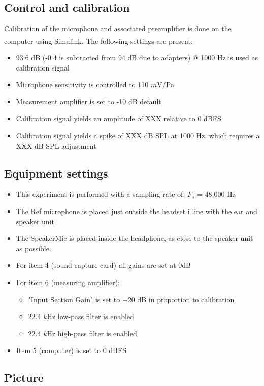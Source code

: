 \subsection{Control and calibration}
Calibration of the microphone and associated preamplifier is done on the computer using Simulink\textsuperscript{\textregistered}. The following settings are present:
\begin{itemize}
	\item 93.6 dB (-0.4 is subtracted from 94 dB due to adapters) $@$ 1000 Hz is used as calibration signal
	\item Microphone sensitivity is controlled to 110 $m$V/Pa
	\item Measurement amplifier is set to -10 dB default
	\item Calibration signal yields an amplitude of XXX relative to 0 dBFS
	\item  Calibration signal yields a spike of XXX dB SPL at 1000 Hz, which requires a XXX dB SPL adjustment
\end{itemize}
\subsection{Equipment settings}
\begin{itemize}
	\item This experiment is performed with a sampling rate of, $F_{s}$ = 48,000 Hz
	\item The Ref microphone is placed just outside the headset i line with the ear and speaker unit
	\item The SpeakerMic is placed inside the headphone, as close to the speaker unit as possible. 
	\item For item 4 (sound capture card) all gains are set at 0dB		
	\item For item 6 (measuring amplifier):
	\begin{itemize}
		\item "Input Section Gain" is set to +20 dB in proportion to calibration
		\item 22.4 $k$Hz low-pass filter is enabled
		\item 22.4 $k$Hz high-pass filter is enabled 
	\end{itemize}
	\item Item 5 (computer) is set to 0 dBFS
\end{itemize}

\subsection{Picture}

